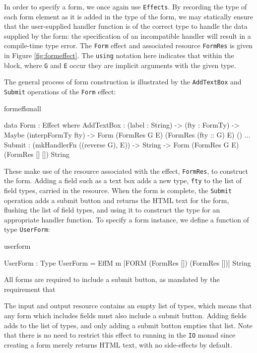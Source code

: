 In order to specify a form, we once again use \texttt{Effects}. By recording
the type of each form element as it is added in the type of the form, we may
statically ensure that the user-supplied handler function is of the correct
type to handle the data supplied by the form: the specification of an
incompatible handler will result in a compile-time type error. The \texttt{Form}
effect and associated resource \texttt{FormRes} is given in Figure 
\ref{fig:formeffect}.
The \texttt{using} notation here indicates that within
the block, where \texttt{G} and \texttt{E} occur they are implicit arguments with
the given type.

The general process of form construction is illustrated by the \texttt{AddTextBox}
and \texttt{Submit} operations of the \texttt{Form} effect:

\begin{SaveVerbatim}{formeffsmall}

data Form : Effect where
  AddTextBox : (label : String) -> (fty : FormTy) -> 
               Maybe (interpFormTy fty) -> 
               Form (FormRes G E) 
                    (FormRes (fty :: G) E) () 
     ...
  Submit : (mkHandlerFn ((reverse G), E)) -> String -> 
           Form (FormRes G E) (FormRes [] []) String

\end{SaveVerbatim}

\noindent
These make use of the resource associated with the effect, \texttt{FormRes}, to
construct the form. Adding a field such as a text box adds a new type, \texttt{fty}
to the list of field types, carried in the resource. When the form is complete,
the \texttt{Submit} operation adds a submit button and returns the
HTML text for the form, flushing the list of field
types, and using it to construct the type for an appropriate handler function.
%
To specify a form instance, we define a function of type \texttt{UserForm}:

\begin{SaveVerbatim}{userform}

UserForm : Type
UserForm = EffM m [FORM (FormRes []) 
                        (FormRes [])] String

\end{SaveVerbatim}

\noindent
All forms are required to include a submit button, as mandated by the
requirement that 

The input and output resource contains an empty list of types, which means that
any form which includes fields must also include a submit button. Adding fields
adds to the list of types, and only adding a submit button empties that list.
Note that there is no need to restrict this effect to running in the \texttt{IO}
monad since creating a form merely returns HTML text, with no side-effects by
default.

